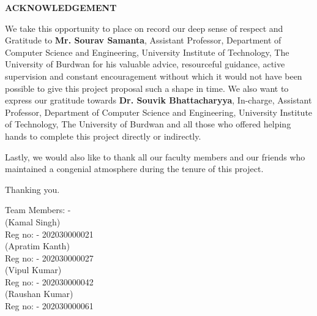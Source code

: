 \documentclass{report}
\begin{document}
\begin{titlepage}
    \centering
    \textbf{\huge ACKNOWLEDGEMENT}
    \vspace{1.5cm}

    \onehalfspacing
    \noindent
         \begin{justify}
         We take this opportunity to place on record our deep sense of respect and Gratitude to \textbf{Mr. Sourav Samanta}, Assistant Professor, Department of Computer Science and Engineering, University Institute of Technology, The University of Burdwan for his valuable advice, resourceful guidance, active supervision and constant encouragement without which it would not have been possible to give this project proposal such a shape in time. We also want to express our gratitude towards \textbf{Dr. Souvik Bhattacharyya}, In-charge, Assistant Professor, Department of Computer Science and Engineering, University Institute of Technology, The University of Burdwan and all those who offered helping hands to complete this project directly or indirectly.

    Lastly, we would also like to thank all our faculty members and our friends who maintained a congenial atmosphere during the tenure of this project.
        \end{justify}

   
    \vspace{0.5cm}
    Thanking you.

    \vspace{1cm}

    \begin{flushright}
        Team Members: - \\
        \vspace{0.5cm}
        (Kamal Singh) \\
        Reg no: - 202030000021 \\
        \vspace{0.5cm}
        (Apratim Kanth) \\
        Reg no: - 202030000027 \\
        \vspace{0.5cm}
        (Vipul Kumar) \\
        Reg no: - 202030000042 \\
        \vspace{0.5cm}
        (Raushan Kumar) \\
        Reg no: - 202030000061
    \end{flushright}
\end{titlepage}
\end{document}
